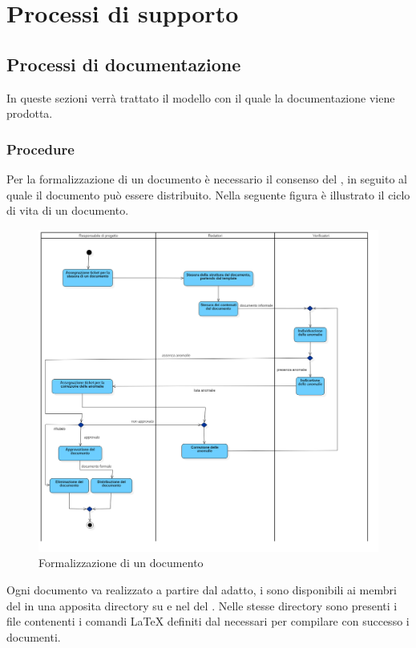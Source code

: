 \documentclass[a4paper, titlepage]{article}
\begin{document}
\newpage

\section{Processi di supporto}

\subsection{Processi di documentazione}
In queste sezioni verrà trattato il modello con il quale la documentazione viene prodotta.

\subsubsection{Procedure}

Per la formalizzazione di un documento è necessario il consenso del , in seguito al quale il documento può essere distribuito.
Nella seguente figura è illustrato il ciclo di vita di un documento.
\begin{figure}[!h]
	\includegraphics[width=\textwidth]{Img/docflow.png}
	\caption{Formalizzazione di un documento}
	\label{fig:documento}
\end{figure}
\newpage

Ogni documento va realizzato a partire dal  adatto, i  sono disponibili ai membri del  in una apposita directory su  e nel   del .
Nelle stesse directory sono presenti i file contenenti i comandi \LaTeX{} definiti dal  necessari per compilare con successo i documenti.
\end{document}
